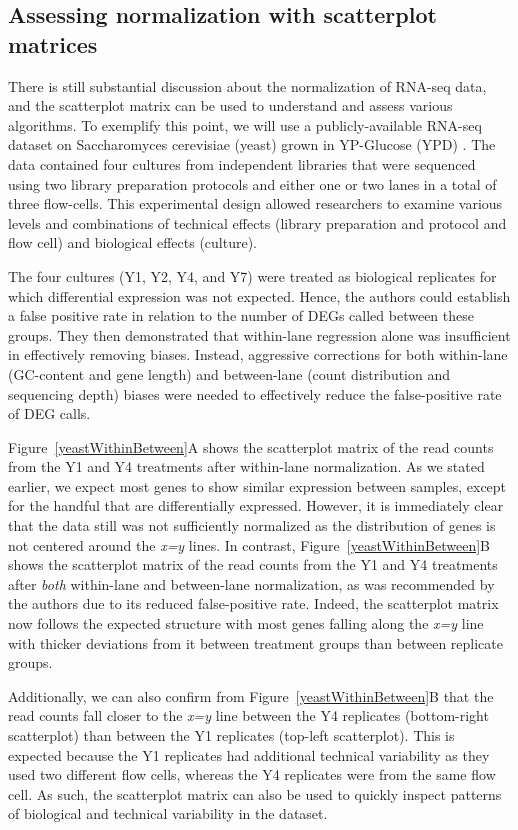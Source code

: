 \documentclass{bioinfo}
\begin{document}
\subsection{Assessing normalization with scatterplot matrices}

There is still substantial discussion about the normalization of RNA-seq data, and the scatterplot matrix can be used to understand and assess various algorithms. To exemplify this point, we will use a publicly-available RNA-seq dataset on Saccharomyces cerevisiae (yeast) grown in YP-Glucose (YPD) \citep{Risso}. The data contained four cultures from independent libraries that were sequenced using two library preparation protocols and either one or two lanes in a total of three flow-cells. This experimental design allowed researchers to examine various levels and combinations of technical effects (library preparation and protocol and flow cell) and biological effects (culture).

The four cultures (Y1, Y2, Y4, and Y7) were treated as biological replicates for which differential expression was not expected. Hence, the authors could establish a false positive rate in relation to the number of DEGs called between these groups. They then demonstrated that within-lane regression alone was insufficient in effectively removing biases. Instead, aggressive corrections for both within-lane (GC-content and gene length) and between-lane (count distribution and sequencing depth) biases were needed to effectively reduce the false-positive rate of DEG calls.

Figure~\ref{yeastWithinBetween}A shows the scatterplot matrix of the read counts from the Y1 and Y4 treatments after within-lane normalization. As we stated earlier, we expect most genes to show similar expression between samples, except for the handful that are differentially expressed. However, it is immediately clear that the data still was not sufficiently normalized as the distribution of genes is not centered around the \textit{x=y} lines. In contrast, Figure~\ref{yeastWithinBetween}B shows the scatterplot matrix of the read counts from the Y1 and Y4 treatments after \textit{both} within-lane and between-lane normalization, as was recommended by the authors due to its reduced false-positive rate. Indeed, the scatterplot matrix now follows the expected structure with most genes falling along the \textit{x=y} line with thicker deviations from it between treatment groups than between replicate groups.

Additionally, we can also confirm from Figure~\ref{yeastWithinBetween}B that the read counts fall closer to the \textit{x=y} line between the Y4 replicates (bottom-right scatterplot) than between the Y1 replicates (top-left scatterplot). This is expected because the Y1 replicates had additional technical variability as they used two different flow cells, whereas the Y4 replicates were from the same flow cell. As such, the scatterplot matrix can also be used to quickly inspect patterns of biological and technical variability in the dataset.
\end{document}

